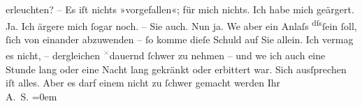 \begin{ledgroupsized}[t]{13cm}
               erleuchten? – Es iſt nichts »vorgefallen«; für mich nichts. Ich habe mich geärgert.
               Ja. Ich ärgere mich ſogar noch. – Sie auch. Nun ja. We{\geminationn}
               aber ein Anlaſs \substVorne{}\textsuperscript{dſs}\substDazwischen{}ſein ſoll\substHinten{}, ſich von einander abzu{\pb}wenden – ſo
               komme dieſe Schuld auf Sie allein. Ich vermag es nicht, – dergleichen \substVorne{}\textsuperscript{\textcolor{gray}{×}}\substDazwischen{}dauernd\substHinten{} ſchwer zu nehmen – und we{\geminationn} ich auch \strikeout{\textcolor{gray}{×}\-\textcolor{gray}{×}\-\textcolor{gray}{×}\-\textcolor{gray}{×}\-\textcolor{gray}{×}\-\textcolor{gray}{×}\-\textcolor{gray}{×}\-\textcolor{gray}{×}\-\textcolor{gray}{×}}{ }\strikeout{\textcolor{gray}{und}} eine Stunde lang oder eine Nacht lang gekränkt oder erbittert war. Sich
               ausſprechen iſt alles. Aber es darf einem nicht {\pb}zu ſchwer gemacht werden \pend
           \pstart
           Ihr {\\[\baselineskip]}\spacefill\mbox{A. S.}\pend
           \leftskip=0em{}
         
         \endnumbering{}\end{ledgroupsized}\begin{anhang}\end{anhang}\newcommand{\dateiname}{L02989}\newcommand{\titel}{Arthur Schnitzler an Felix Salten, 10. 11. 1903}\newcommand{\editorInnen}{Martin Anton Müller und Laura Untner}
      
